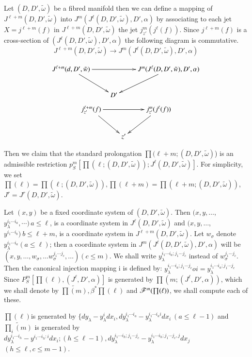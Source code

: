 Let $(D, D', \tilde{\omega})$ be a fibred manifold then we can define
a mapping of $J^{\ell + m} (D, D' , \tilde{\omega})$ into $J^m (J^\ell
(D, D' , \tilde{\omega}), D', \alpha)$ by associating to each jet $X =
j^{\ell + m}(f)$ in $J^{\ell +m}(D, D' , \tilde{\omega})$ the jet
$j^m_{z'} (j^\ell(f))$. Since $j^{\ell + m}(f)$ is a cross-section of
$(J^\ell (D, D' , \tilde{\omega}), D' , \alpha)$ the following
diagram is commutative. 
$$
J^{\ell+m} (D, D' , \tilde{\omega}) \rightarrow J^m(J^\ell(D, D' ,
\tilde{\omega}), D', \alpha) 
$$

\[
\xymatrix{J^{\ell+m} (d, D', \tilde{w}) \ar[rr] \ar[dr] & & J^{m} (J^{\ell} (D, D',
    \tilde{w}), D', \alpha)\ar[dl]\\
& D'& }
\]
\[
\xymatrix{j^{\ell+m}_{z'}(f) \ar[rr] \ar[dr] & & j^m_{z'} (j^{\ell}(f) )
    \ar[dl]\\
& z'&}
\]\pageoriginale

Then we claim that the standard prolongation $\prod (\ell + m; (D, D'
, \tilde{\omega})$) is an admissible restriction $p^m_S [\prod (\ell ;
  (D, D' , \tilde{\omega})) ; J^\ell (D, D' , \tilde{\omega})]$. For
simplicity, we set $\prod (\ell) = \prod (\ell ; (D, D' ,
\tilde{\omega})), \prod (\ell + m) = \prod (\ell+m; (D, D' ,
\tilde{\omega}))$, $J^r = J^r (D, D' , \tilde{\omega})$. 

Let $(x, y)$ be a fixed coordinate system of $(D, D' ,
\tilde{\omega})$. Then $(x, y, \ldots$, $y^{i_1 \cdots i_a}_{\lambda} ,
\cdots)\, a \leq \ell$, is a coordinate system in $J^\ell (D, D' ,
\tilde{\omega})$ and $(x, y, \ldots$, $y^{i_1 \cdots i_b})~ b \leq \ell
+ m$, is a coordinate system in $J^{\ell + m} (D, D' ,
\tilde{\omega})$. Let $w _\sigma$ denote $y^{i_1 \cdots i_a}_{\lambda}
(a \leq \ell)$; then a coordinate system in $J^m (J^\ell(D, D' ,
\tilde{\omega}), D', \alpha)$ will be $(x, y, \ldots , w_\sigma ,
\ldots w^{j_1 \cdots j_c}_\sigma , \ldots) (c \leq m)$. We shall write
$y^{i_1 \cdots i_a ; j_1 \cdots j_c}_{\lambda}$ instead of $w^{j_1
  \cdots j_c}_{\sigma}$. Then the canonical injection mapping i is
defined by: $y^{i_1 \cdots i_a ; j_1 \cdots j_c}_{\lambda} oi =
y^{i_1 \cdots i_a ; j_1 \cdots j_c}_{\lambda}$ Since $P^m_S [\prod
  (\ell), (J^\ell , D', \alpha)]$ is generated by $\prod (m;
(J^\ell , D' , \alpha ))$, which we shall denote by $\widetilde{\prod (m)},
\beta^* \prod (\ell)$ and $\mathscr{F}^m \break (\prod (\ell))$, we shall
compute each of these. 

$\prod (\ell)$\pageoriginale is generated by $\{ dy_{\lambda } - y^i_{\lambda} dx_i
, dy^{i_1 \cdots i_a}_{\lambda}- y^{i_1 \cdots i_a i}_{\lambda} dx_i
~(a \leq \ell - 1)$ and $\widetilde{\prod_i (m)}$ is generated by $d y^{i_1 \cdots
  i_h}_{\lambda} - y^{i_1 \cdots i_h:i} dx_i ; (h \leq \ell-1), dy^{i_1 \cdots i_h ; j_1
  \cdots j_c}_\lambda - y^{i_1 \cdots i_h; j_1 \cdots j_c, j}_{\lambda} dx_j$
 $(h \leq \ell, c \leq m-1)$. 

